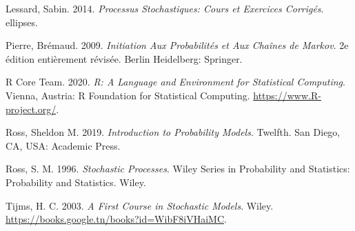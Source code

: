 \documentclass[
]{book}
\theoremstyle{definition}
\theoremstyle{definition}
\theoremstyle{definition}
\theoremstyle{remark}
\begin{document}
\leavevmode\hypertarget{ref-sabin}{}%
Lessard, Sabin. 2014. \emph{Processus Stochastiques: Cours et Exercices Corrigés}. ellipses.

\leavevmode\hypertarget{ref-bremaud}{}%
Pierre, Brémaud. 2009. \emph{Initiation Aux Probabilités et Aux Chaînes de Markov}. 2e édition entièrement révisée. Berlin Heidelberg: Springer.

\leavevmode\hypertarget{ref-R-base}{}%
R Core Team. 2020. \emph{R: A Language and Environment for Statistical Computing}. Vienna, Austria: R Foundation for Statistical Computing. \url{https://www.R-project.org/}.

\leavevmode\hypertarget{ref-Ross97}{}%
Ross, Sheldon M. 2019. \emph{Introduction to Probability Models}. Twelfth. San Diego, CA, USA: Academic Press.

\leavevmode\hypertarget{ref-ross1996stochastic}{}%
Ross, S. M. 1996. \emph{Stochastic Processes}. Wiley Series in Probability and Statistics: Probability and Statistics. Wiley.

\leavevmode\hypertarget{ref-tijms2003first}{}%
Tijms, H. C. 2003. \emph{A First Course in Stochastic Models}. Wiley. \url{https://books.google.tn/books?id=WibF8iVHaiMC}.
\end{document}
